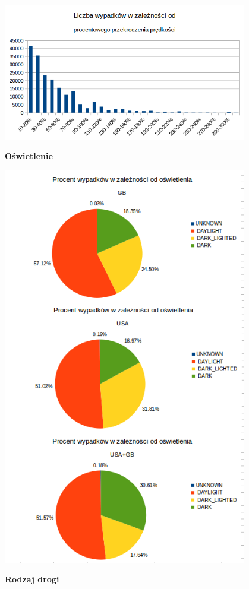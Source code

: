 \centerline{\includegraphics[width=0.8\textwidth]{images/hipotheses/speed/speed_exceeded_by_percent.png}}

\textbf{Oświetlenie}

\centerline{\includegraphics[width=0.8\textwidth]{images/hipotheses/lighting/lighting.png}}

\textbf{Rodzaj drogi}

